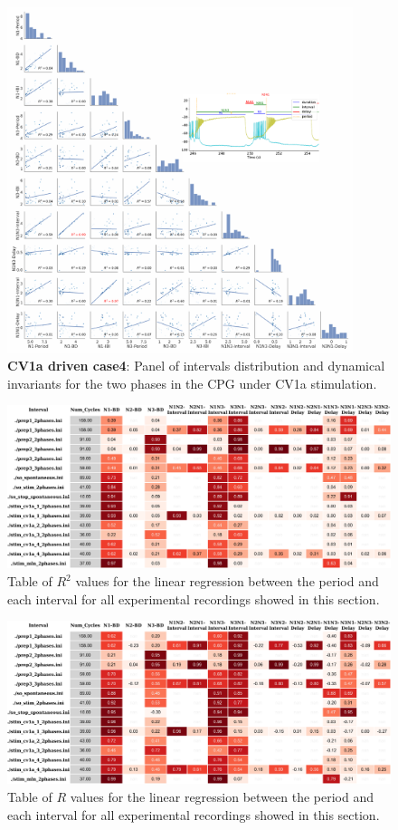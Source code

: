 \begin{figure}[htbp]
	\centering
	\includegraphics[width=0.9\textwidth]{./invariants/data/SUSSEX/CV1a_driven4/images/2phases/panel_with_pairplot.pdf}
	\caption{\textbf{CV1a driven case4}: Panel of intervals distribution and dynamical invariants for the two phases in the CPG under CV1a stimulation.}
	\label{fig:cv1a 4 2phases pairplot}
\end{figure}


\begin{figure}
	\includegraphics[width=\textwidth]{./invariants/styled_table_invariants_r-squared.pdf}
	\caption{Table of $R^2$ values for the linear regression between the period and each interval for all experimental recordings showed in this section.}
	\label{fig:R2 table}
\end{figure}

\begin{figure}
	\includegraphics[width=\textwidth]{./invariants/styled_table_invariants_r-value.pdf}
	\caption{Table of $R$ values for the linear regression between the period and each interval for all experimental recordings showed in this section.}
	\label{fig:R table}
\end{figure}



